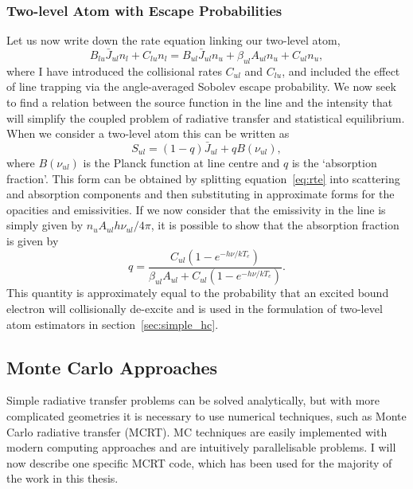 \subsubsection{Two-level Atom with Escape Probabilities}

Let us now write down the rate equation linking our two-level atom,
\begin{equation}
B_{lu} \bar{J}_{ul} n_l + C_{lu} n_l = 
B_{ul} \bar{J}_{ul} n_u + \beta_{ul} A_{ul} n_u + C_{ul} n_u,
\label{eq:rate_2level}
\end{equation}
where I have introduced the collisional rates $C_{ul}$ and $C_{lu}$, and included
the effect of line trapping via the angle-averaged Sobolev escape probability.
We now seek to find a relation between the source function in the line
and the intensity that will simplify the coupled problem of radiative transfer
and statistical equilibrium. When we consider a two-level atom
this can be written as \citep{mihalas}
\begin{equation}
S_{ul} = (1 - q) \bar{J}_{ul} + q B(\nu_{ul}),
\label{eq:rate_2level}
\end{equation}
where $B(\nu_{ul})$ is the Planck function at line centre and $q$ is the 
`absorption fraction'. This form can be obtained by splitting
equation~\ref{eq:rte} into scattering and absorption components and then
substituting in approximate forms for the opacities and emissivities.
If we now consider that the emissivity in the line is simply give\cal n
by $n_u A_{ul} h \nu_{ul} / 4 \pi$, it is possible to show that
the absorption fraction is given by
\begin{equation}
q = \frac{C_{ul} (1 - e^{-h\nu/kT_e})}{\beta_{ul} A_{ul} + C_{ul} (1 - e^{-h\nu/kT_e})}.
\end{equation}
This quantity is approximately equal to
the probability that an excited bound electron
will collisionally de-excite and is used in the formulation of two-level atom
estimators in section~\ref{sec:simple_hc}.



\subsection{Monte Carlo Approaches}

Simple radiative transfer problems can be solved analytically,
but with more complicated geometries it is necessary to use numerical techniques,
such as Monte Carlo radiative transfer (MCRT). 
MC techniques are easily implemented with modern computing approaches and 
are intuitively parallelisable problems. I will now describe one specific 
MCRT code, which has been used for the majority of the work in this thesis.









